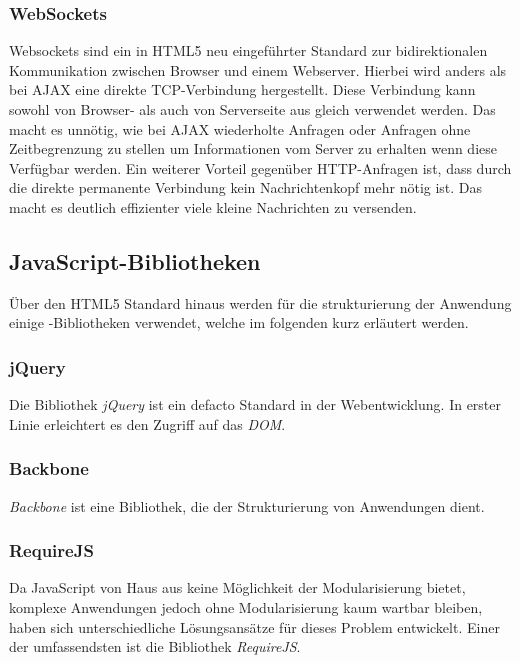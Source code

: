 \subsubsection{WebSockets}

Websockets sind ein in HTML5 neu eingeführter Standard zur bidirektionalen  Kommunikation zwischen
Browser und einem Webserver. Hierbei wird anders als bei  AJAX eine direkte TCP-Verbindung
hergestellt. Diese Verbindung kann sowohl von  Browser- als auch von Serverseite aus gleich
verwendet werden. Das macht es  unnötig, wie bei AJAX wiederholte Anfragen oder Anfragen ohne
Zeitbegrenzung zu  stellen um Informationen vom Server zu erhalten wenn diese Verfügbar werden. Ein
weiterer Vorteil gegenüber HTTP-Anfragen ist, dass durch die direkte permanente Verbindung kein
Nachrichtenkopf mehr nötig ist. Das macht es deutlich  effizienter viele kleine Nachrichten zu
versenden.

\subsection{JavaScript-Bibliotheken}

Über den HTML5 Standard hinaus werden für die strukturierung der Anwendung einige 
-Bibliotheken verwendet, welche im folgenden kurz erläutert werden.

\subsubsection{jQuery}

Die Bibliothek \textit{jQuery} ist ein defacto Standard in der Webentwicklung.  In erster Linie
erleichtert es den Zugriff auf das \textit{DOM}. 

\subsubsection{Backbone}

\textit{Backbone} ist eine Bibliothek, die der Strukturierung von  Anwendungen dient.

\subsubsection{RequireJS}

Da JavaScript von Haus aus keine Möglichkeit der Modularisierung bietet, komplexe Anwendungen
jedoch ohne Modularisierung kaum wartbar bleiben, haben sich unterschiedliche Lösungsansätze für
dieses Problem entwickelt. Einer der  umfassendsten ist die Bibliothek \textit{RequireJS}.

